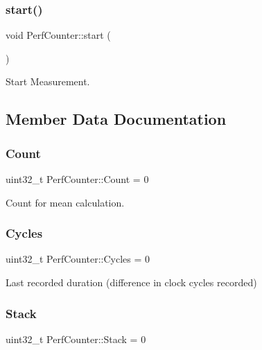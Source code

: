 \subsubsection{\texorpdfstring{start()}{start()}}
{\footnotesize\ttfamily void Perf\+Counter\+::start (\begin{DoxyParamCaption}{ }\end{DoxyParamCaption})\hspace{0.3cm}{\ttfamily [inline]}}



Start Measurement. 



\subsection{Member Data Documentation}
\mbox{\label{classPerfCounter_a8f86300240da2178dea60346ea72651c}} 
\subsubsection{\texorpdfstring{Count}{Count}}
{\footnotesize\ttfamily uint32\+\_\+t Perf\+Counter\+::\+Count = 0}



Count for mean calculation. 

\mbox{\label{classPerfCounter_a60984f26cf145882c0355d28d8233e0a}} 
\subsubsection{\texorpdfstring{Cycles}{Cycles}}
{\footnotesize\ttfamily uint32\+\_\+t Perf\+Counter\+::\+Cycles = 0}



Last recorded duration (difference in clock cycles recorded) 

\mbox{\label{classPerfCounter_ad440629d44a2bfd9b4d8de185ff66d27}} 
\subsubsection{\texorpdfstring{Stack}{Stack}}
{\footnotesize\ttfamily uint32\+\_\+t Perf\+Counter\+::\+Stack = 0}



